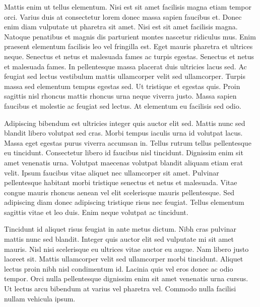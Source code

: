 \documentclass[11pt,a4paper]{article}
\begin{document}
Mattis enim ut tellus elementum. Nisi est sit amet facilisis magna etiam tempor orci. Varius duis at consectetur lorem donec massa sapien faucibus et. Donec enim diam vulputate ut pharetra sit amet. Nisi est sit amet facilisis magna. Natoque penatibus et magnis dis parturient montes nascetur ridiculus mus. Enim praesent elementum facilisis leo vel fringilla est. Eget mauris pharetra et ultrices neque. Senectus et netus et malesuada fames ac turpis egestas. Senectus et netus et malesuada fames. In pellentesque massa placerat duis ultricies lacus sed. Ac feugiat sed lectus vestibulum mattis ullamcorper velit sed ullamcorper. Turpis massa sed elementum tempus egestas sed. Ut tristique et egestas quis. Proin sagittis nisl rhoncus mattis rhoncus urna neque viverra justo. Massa sapien faucibus et molestie ac feugiat sed lectus. At elementum eu facilisis sed odio.

Adipiscing bibendum est ultricies integer quis auctor elit sed. Mattis nunc sed blandit libero volutpat sed cras. Morbi tempus iaculis urna id volutpat lacus. Massa eget egestas purus viverra accumsan in. Tellus rutrum tellus pellentesque eu tincidunt. Consectetur libero id faucibus nisl tincidunt. Dignissim enim sit amet venenatis urna. Volutpat maecenas volutpat blandit aliquam etiam erat velit. Ipsum faucibus vitae aliquet nec ullamcorper sit amet. Pulvinar pellentesque habitant morbi tristique senectus et netus et malesuada. Vitae congue mauris rhoncus aenean vel elit scelerisque mauris pellentesque. Sed adipiscing diam donec adipiscing tristique risus nec feugiat. Tellus elementum sagittis vitae et leo duis. Enim neque volutpat ac tincidunt.

Tincidunt id aliquet risus feugiat in ante metus dictum. Nibh cras pulvinar mattis nunc sed blandit. Integer quis auctor elit sed vulputate mi sit amet mauris. Nisl nisi scelerisque eu ultrices vitae auctor eu augue. Nam libero justo laoreet sit. Mattis ullamcorper velit sed ullamcorper morbi tincidunt. Aliquet lectus proin nibh nisl condimentum id. Lacinia quis vel eros donec ac odio tempor. Orci nulla pellentesque dignissim enim sit amet venenatis urna cursus. Ut lectus arcu bibendum at varius vel pharetra vel. Commodo nulla facilisi nullam vehicula ipsum.
\end{document}

